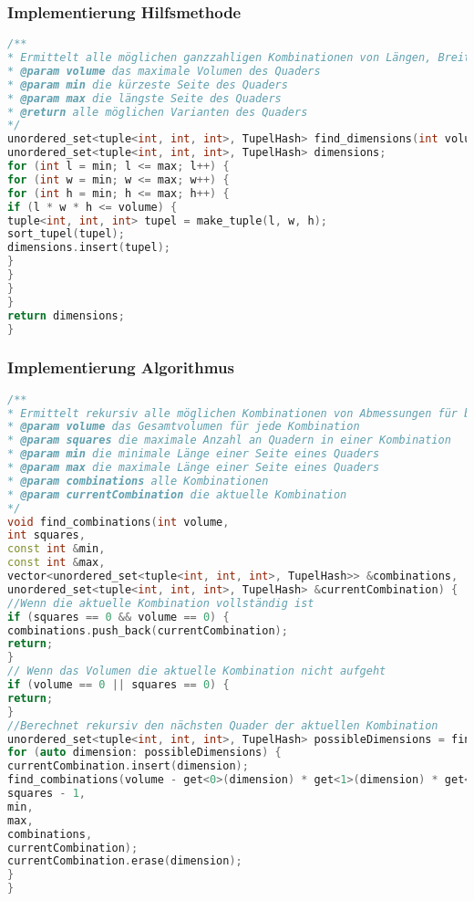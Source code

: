 \documentclass[a4paper,10pt,ngerman]{scrartcl}
\begin{document}
    \subsubsection{Implementierung Hilfsmethode}
    \begin{lstlisting}[frame=single,language=C++,title=Methode find\_dimensions,breaklines=true,label={lst:code_findDimensions}]
/**
* Ermittelt alle möglichen ganzzahligen Kombinationen von Längen, Breiten und Höhen für einen Quader
* @param volume das maximale Volumen des Quaders
* @param min die kürzeste Seite des Quaders
* @param max die längste Seite des Quaders
* @return alle möglichen Varianten des Quaders
*/
unordered_set<tuple<int, int, int>, TupelHash> find_dimensions(int volume, const int &min, const int &max) {
unordered_set<tuple<int, int, int>, TupelHash> dimensions;
for (int l = min; l <= max; l++) {
for (int w = min; w <= max; w++) {
for (int h = min; h <= max; h++) {
if (l * w * h <= volume) {
tuple<int, int, int> tupel = make_tuple(l, w, h);
sort_tupel(tupel);
dimensions.insert(tupel);
}
}
}
}
return dimensions;
}
    \end{lstlisting}
    \subsubsection{Implementierung Algorithmus}
    \begin{lstlisting}[frame=single,language=C++,title=Methode find\_combinations,breaklines=true,label={lst:code_findCombinations}]
/**
* Ermittelt rekursiv alle möglichen Kombinationen von Abmessungen für beliebig viele Quader
* @param volume das Gesamtvolumen für jede Kombination
* @param squares die maximale Anzahl an Quadern in einer Kombination
* @param min die minimale Länge einer Seite eines Quaders
* @param max die maximale Länge einer Seite eines Quaders
* @param combinations alle Kombinationen
* @param currentCombination die aktuelle Kombination
*/
void find_combinations(int volume,
int squares,
const int &min,
const int &max,
vector<unordered_set<tuple<int, int, int>, TupelHash>> &combinations,
unordered_set<tuple<int, int, int>, TupelHash> &currentCombination) {
//Wenn die aktuelle Kombination vollständig ist
if (squares == 0 && volume == 0) {
combinations.push_back(currentCombination);
return;
}
// Wenn das Volumen die aktuelle Kombination nicht aufgeht
if (volume == 0 || squares == 0) {
return;
}
//Berechnet rekursiv den nächsten Quader der aktuellen Kombination
unordered_set<tuple<int, int, int>, TupelHash> possibleDimensions = find_dimensions(volume, min, max);
for (auto dimension: possibleDimensions) {
currentCombination.insert(dimension);
find_combinations(volume - get<0>(dimension) * get<1>(dimension) * get<2>(dimension),
squares - 1,
min,
max,
combinations,
currentCombination);
currentCombination.erase(dimension);
}
}
    \end{lstlisting}
\end{document}
